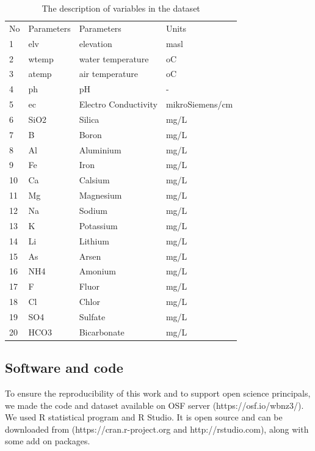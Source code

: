 \documentclass{sciposter}
\begin{document}
\begin{multicols}{3}
\begin{table}[]
\centering
\caption{The description of variables in the dataset}
\label{descriptor}
\begin{tabular}{llll}
No & Parameters & Parameters           & Units            \\
1  & elv        & elevation            & masl             \\
2  & wtemp      & water temperature    & oC               \\
3  & atemp      & air temperature      & oC               \\
4  & ph         & pH                   & -                \\
5  & ec         & Electro Conductivity & mikroSiemens/cm \\
6  & SiO2       & Silica               & mg/L             \\
7  & B          & Boron                & mg/L             \\
8  & Al         & Aluminium            & mg/L             \\
9  & Fe         & Iron                 & mg/L             \\
10 & Ca         & Calsium              & mg/L             \\
11 & Mg         & Magnesium            & mg/L             \\
12 & Na         & Sodium               & mg/L             \\
13 & K          & Potassium            & mg/L             \\
14 & Li         & Lithium              & mg/L             \\
15 & As         & Arsen                & mg/L             \\
16 & NH4        & Amonium              & mg/L             \\
17 & F          & Fluor                & mg/L             \\
18 & Cl         & Chlor                & mg/L             \\
19 & SO4        & Sulfate              & mg/L             \\
20 & HCO3       & Bicarbonate          & mg/L            
\end{tabular}
\end{table}

\subsection{Software and code}
To ensure the reproducibility of this work and to support open science principals, we made the code and dataset available on OSF server (https://osf.io/wbnz3/). We used R statistical program and R Studio. It is open source and can be downloaded from (https://cran.r-project.org and http://rstudio.com), along with some add on packages.


\end{multicols}
\end{document}
